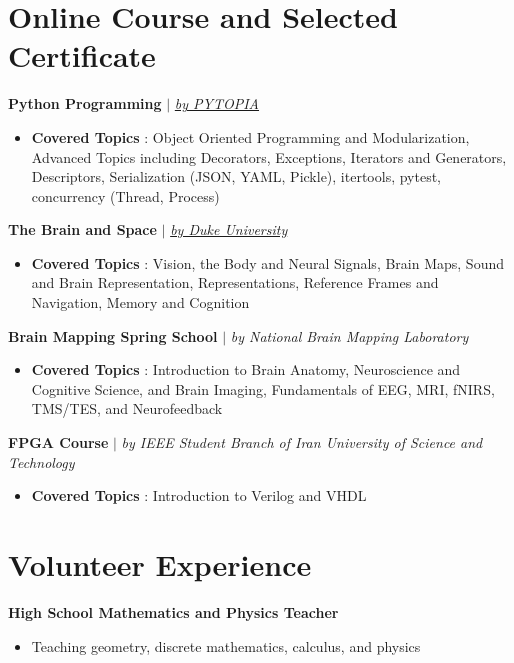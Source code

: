 \documentclass[11pt,a4paper,sans]{moderncv}        %
\begin{document}
\section{Online Course and Selected Certificate}
 {}{\textbf{Python Programming} $|$ \textit{\href{https://www.pytopia.ai}{by PYTOPIA}}}
\begin{itemize}
    \item \textbf{Covered Topics} {: Object Oriented Programming and Modularization, Advanced Topics including Decorators, Exceptions, Iterators and Generators, Descriptors, Serialization (JSON, YAML, Pickle), itertools, pytest, concurrency (Thread, Process)}
\end{itemize}
\vspace{2 mm}
{}{\textbf{The Brain and Space} $|$ \textit{\href{https://www.coursera.org/learn/human-brain}{by Duke University}}}
\begin{itemize}
    \item \textbf{Covered Topics} {: Vision, the Body and Neural Signals, Brain Maps, Sound and Brain Representation, Representations, Reference Frames and Navigation, Memory and Cognition}
\end{itemize}
\vspace{2 mm}
{}{\textbf{Brain Mapping Spring School} $|$ \textit{by National Brain Mapping Laboratory}}
\begin{itemize}
    \item \textbf{Covered Topics} {: Introduction to Brain Anatomy, Neuroscience and Cognitive Science, and Brain
              Imaging, Fundamentals of EEG, MRI, fNIRS, TMS/TES, and Neurofeedback}
\end{itemize}
\vspace{2 mm}
{}{\textbf{FPGA Course} $|$ \textit{by IEEE Student Branch of Iran University of Science and Technology}}
\begin{itemize}
    \item \textbf{Covered Topics} {: Introduction to Verilog and VHDL}
\end{itemize}

\section{Volunteer Experience}
 {}{\textbf{High School Mathematics and Physics Teacher}}
\begin{itemize}
    \item Teaching geometry, discrete mathematics, calculus, and physics
\end{itemize}
\end{document}
